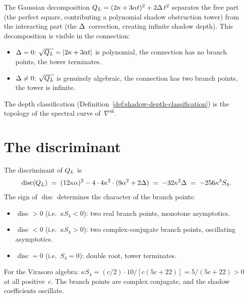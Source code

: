 The Gaussian decomposition
$Q_L = (2\kappa + 3\alpha t)^2 + 2\Delta\, t^2$
separates the free part (the perfect square, contributing a
polynomial shadow obstruction tower) from the interacting part (the
$\Delta$~correction, creating infinite shadow depth). This
decomposition is visible in the connection:
\begin{itemize}
\item $\Delta = 0$: $\sqrt{Q_L} = |2\kappa + 3\alpha t|$
 is polynomial, the connection has no branch points, the tower
 terminates.
\item $\Delta \neq 0$: $\sqrt{Q_L}$ is genuinely
 algebraic, the connection has two branch points, the tower
 is infinite.
\end{itemize}
The depth classification (Definition~\ref{def:shadow-depth-classification})
is the topology of the spectral curve of~$\nabla^{\mathrm{sh}}$.


\section{The discriminant}
\label{sec:comp-discriminant}

The discriminant of $Q_L$ is
\begin{equation}\label{eq:comp-discriminant}
 \operatorname{disc}(Q_L)
 \;=\; (12\kappa\alpha)^2 - 4 \cdot 4\kappa^2
 \cdot (9\alpha^2 + 2\Delta)
 \;=\; -32\kappa^2\Delta
 \;=\; -256\kappa^3 S_4.
\end{equation}
The sign of $\operatorname{disc}$ determines the character of
the branch points:
\begin{itemize}
\item $\operatorname{disc} > 0$ (i.e.\ $\kappa S_4 < 0$): two
 real branch points, monotone asymptotics.
\item $\operatorname{disc} < 0$ (i.e.\ $\kappa S_4 > 0$): two
 complex-conjugate branch points, oscillating asymptotics.
\item $\operatorname{disc} = 0$ (i.e.\ $S_4 = 0$): double root,
 tower terminates.
\end{itemize}

For the Virasoro algebra:
$\kappa S_4 = (c/2) \cdot 10/[c(5c+22)] = 5/(5c+22) > 0$
at all positive~$c$. The branch points are complex conjugate,
and the shadow coefficients oscillate.

